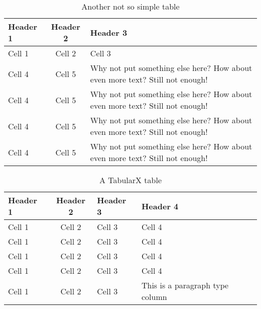 \documentclass[12pt, a4paper]{article}
\begin{document}
\kant[3]

\begin{table}[htbp]
    \centering
    \begin{tabular}{| l || c | m{} |}
        \hline
        Header 1 & Header 2 & Header 3 \\
        \hline\hline
        Cell 1 & Cell 2 & Cell 3 \\
        \hline
        Cell 4 & Cell 5 & Why not put something else here? How about even more text? Still not enough!\\
        \hline
        Cell 4 & Cell 5 & Why not put something else here? How about even more text? Still not enough! \\
        \hline
        Cell 4 & Cell 5 & Why not put something else here? How about even more text? Still not enough! \\
        \hline
        Cell 4 & Cell 5 & Why not put something else here? How about even more text? Still not enough! \\
        \hline
    \end{tabular}
    \caption{Another not so simple table}
    \label{tab:simple3}
\end{table}

\kant[4]

\begin{table}[htbp]
    \centering
    \begin{tabularx}{0.8\textwidth}{| l || c | X | Y |}
        \hline
        Header 1 & Header 2 & Header 3 & Header 4 \\
        \hline\hline
        Cell 1 & Cell 2 & Cell 3 & Cell 4 \\
        \hline
        Cell 1 & Cell 2 & Cell 3 & Cell 4 \\
        \hline
        Cell 1 & Cell 2 & Cell 3 & Cell 4 \\
        \hline
        Cell 1 & Cell 2 & Cell 3 & Cell 4 \\
        \hline
        Cell 1 & Cell 2 & Cell 3 & This is a paragraph type column \\
        \hline

    \end{tabularx}
    \caption{A TabularX table}
    \label{tab:tabx}
\end{table}

\kant[5]
\end{document}
